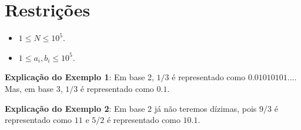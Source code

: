 
\section*{Restrições}

\begin{itemize}
\item $1 \leq N \leq 10^5$.
\item $1 \leq a_i, b_i \leq 10^5$.
\end{itemize}

\exemplo

\bigskip
\textbf{Explicação do Exemplo 1}: Em base 2, $1/3$ é representado como $0.01010101...$. Mas, em base 3, $1/3$ é representado como $0.1$.

\textbf{Explicação do Exemplo 2}: Em base 2 já não teremos dízimas, pois $9/3$ é representado como $11$ e $5/2$ é representado como $10.1$.

